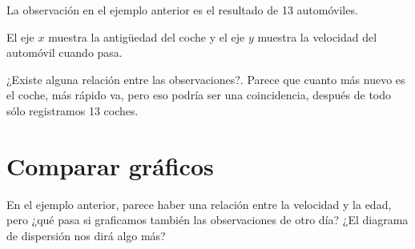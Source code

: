 La observación en el ejemplo anterior es el resultado de 13 automóviles.

El eje \(x\) muestra la antigüedad del coche y el eje \(y\) muestra la
velocidad del automóvil cuando pasa.

¿Existe alguna relación entre las observaciones?. Parece que cuanto más
nuevo es el coche, más rápido va, pero eso podría ser una coincidencia,
después de todo sólo registramos 13 coches.

\section{Comparar gráficos}

En el ejemplo anterior, parece haber una relación entre la velocidad y
la edad, pero ¿qué pasa si graficamos también las observaciones de otro
día? ¿El diagrama de dispersión nos dirá algo más?


